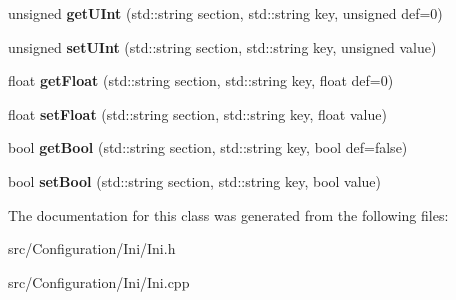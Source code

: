 \begin{DoxyCompactItemize}
\mbox{\label{class_dolly_1_1_configuration_1_1_ini_1_1_ini_aee034dfa0f080b5359f8490779eba46f}} 
unsigned {\bfseries get\+U\+Int} (std\+::string section, std\+::string key, unsigned def=0)
\item 
\mbox{\label{class_dolly_1_1_configuration_1_1_ini_1_1_ini_a928468134c460893de8a7dea4f2935db}} 
unsigned {\bfseries set\+U\+Int} (std\+::string section, std\+::string key, unsigned value)
\item 
\mbox{\label{class_dolly_1_1_configuration_1_1_ini_1_1_ini_adf8ec7754ba40332ebf06fdcb3d9cab6}} 
float {\bfseries get\+Float} (std\+::string section, std\+::string key, float def=0)
\item 
\mbox{\label{class_dolly_1_1_configuration_1_1_ini_1_1_ini_a7a4248b4e44cc74b6d779ff743e16ea7}} 
float {\bfseries set\+Float} (std\+::string section, std\+::string key, float value)
\item 
\mbox{\label{class_dolly_1_1_configuration_1_1_ini_1_1_ini_ac65589fc1b010835f9305e62afa7e499}} 
bool {\bfseries get\+Bool} (std\+::string section, std\+::string key, bool def=false)
\item 
\mbox{\label{class_dolly_1_1_configuration_1_1_ini_1_1_ini_ab72c0e1f5683ca8c8828ce61a3634582}} 
bool {\bfseries set\+Bool} (std\+::string section, std\+::string key, bool value)
\end{DoxyCompactItemize}


The documentation for this class was generated from the following files\+:\begin{DoxyCompactItemize}
\item 
src/\+Configuration/\+Ini/Ini.\+h\item 
src/\+Configuration/\+Ini/Ini.\+cpp\end{DoxyCompactItemize}
